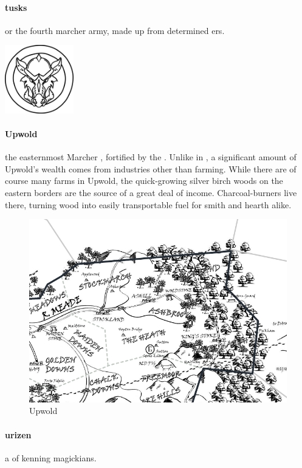 \paragraph{tusks} or  the fourth marcher army, made up from determined ers.  \begin{center}\includegraphics[width=3cm]{encyclopedia/Tusks}\end{center}
\paragraph{Upwold} the easternmost Marcher , fortified by the . Unlike in , a significant amount of Upwold's wealth comes from industries other than farming. While there are of course many farms in Upwold, the quick-growing silver birch woods on the eastern borders are the source of a great deal of income. Charcoal-burners live there, turning wood into easily transportable fuel for smith and hearth alike. \begin{figure}\centering\includegraphics[width=16.3cm,angle=90]{atlasofthemarches/Upwold}\caption{Upwold}\end{figure}
\paragraph{urizen} a  of kenning magickians.
